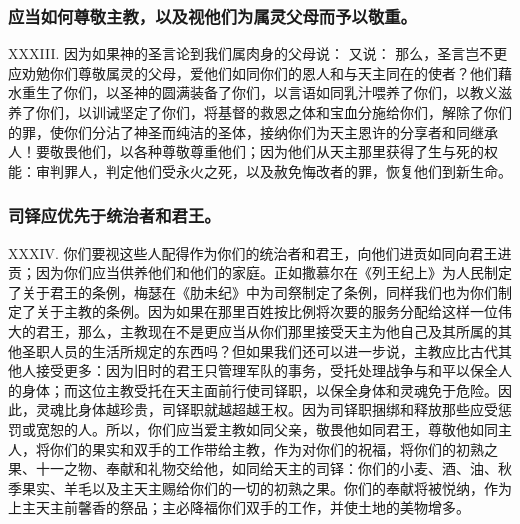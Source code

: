 
\subsubsection{应当如何尊敬主教，以及视他们为属灵父母而予以敬重。}

XXXIII. 因为如果神的圣言论到我们属肉身的父母说：  又说：  那么，圣言岂不更应劝勉你们尊敬属灵的父母，爱他们如同你们的恩人和与天主同在的使者？他们藉水重生了你们，以圣神的圆满装备了你们，以言语如同乳汁喂养了你们，以教义滋养了你们，以训诫坚定了你们，将基督的救恩之体和宝血分施给你们，解除了你们的罪，使你们分沾了神圣而纯洁的圣体，接纳你们为天主恩许的分享者和同继承人！要敬畏他们，以各种尊敬尊重他们；因为他们从天主那里获得了生与死的权能：审判罪人，判定他们受永火之死，以及赦免悔改者的罪，恢复他们到新生命。\par


\subsubsection{司铎应优先于统治者和君王。}

XXXIV. 你们要视这些人配得作为你们的统治者和君王，向他们进贡如同向君王进贡；因为你们应当供养他们和他们的家庭。正如撒慕尔在《列王纪上》为人民制定了关于君王的条例，梅瑟在《肋未纪》中为司祭制定了条例，同样我们也为你们制定了关于主教的条例。因为如果在那里百姓按比例将次要的服务分配给这样一位伟大的君王，那么，主教现在不是更应当从你们那里接受天主为他自己及其所属的其他圣职人员的生活所规定的东西吗？但如果我们还可以进一步说，主教应比古代其他人接受更多：因为旧时的君王只管理军队的事务，受托处理战争与和平以保全人的身体；而这位主教受托在天主面前行使司铎职，以保全身体和灵魂免于危险。因此，灵魂比身体越珍贵，司铎职就越超越王权。因为司铎职捆绑和释放那些应受惩罚或宽恕的人。所以，你们应当爱主教如同父亲，敬畏他如同君王，尊敬他如同主人，将你们的果实和双手的工作带给主教，作为对你们的祝福，将你们的初熟之果、十一之物、奉献和礼物交给他，如同给天主的司铎：你们的小麦、酒、油、秋季果实、羊毛以及主天主赐给你们的一切的初熟之果。你们的奉献将被悦纳，作为上主天主前馨香的祭品；主必降福你们双手的工作，并使土地的美物增多。 \par

